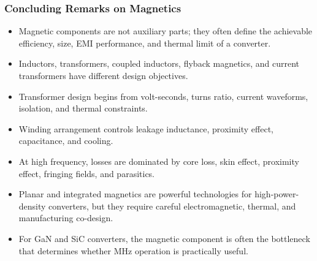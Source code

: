 \begin{frame}
    \frametitle{Concluding Remarks on Magnetics}

    \begin{itemize}
        \item Magnetic components are not auxiliary parts; they often define the achievable efficiency, size, EMI performance, and thermal limit of a converter.

        \item Inductors, transformers, coupled inductors, flyback magnetics, and current transformers have different design objectives.

        \item Transformer design begins from volt-seconds, turns ratio, current waveforms, isolation, and thermal constraints.

        \item Winding arrangement controls leakage inductance, proximity effect, capacitance, and cooling.

        \item At high frequency, losses are dominated by core loss, skin effect, proximity effect, fringing fields, and parasitics.

        \item Planar and integrated magnetics are powerful technologies for high-power-density converters, but they require careful electromagnetic, thermal, and manufacturing co-design.

        \item For GaN and SiC converters, the magnetic component is often the bottleneck that determines whether MHz operation is practically useful.
    \end{itemize}
\end{frame}

